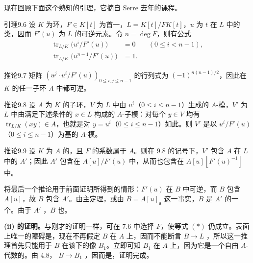 现在回顾下面这个熟知的引理，它摘自 Serre 去年的课程。
\begin{SGAresult}{引理}{9.6}
设 $K$ 为环，$F\in K[t]$ 为首一，$L=K[t]/FK[t]$，$u$ 为 $t$ 在 $L$ 中的类，因而 $F'(u)$ 为 $L$ 的可逆元素。令 $n=\deg F$，则有公式
\[
\begin{aligned}
 \operatorname{tr}_{L/K}\bigl(u^i/F'(u)\bigr)&=0 &&(0\leq i<n-1),\\
 \operatorname{tr}_{L/K}\bigl(u^{n-1}/F'(u)\bigr)&=1.
\end{aligned}
\]
\end{SGAresult}
\begin{SGAresult}{推论}{9.7}
矩阵 $(u^j\cdot u^i/F'(u))_{0\leq i,j\leq n-1}$ 的行列式为 $(-1)^{n(n-1)/2}$，因此在 $K$ 的任一子环 $A$ 中都可逆。
\end{SGAresult}
\begin{SGAresult}{推论}{9.8}
设 $A$ 为 $K$ 的子环，$V$ 为 $L$ 中由 $u^i$（$0\leq i\leq n-1$）生成的 $A$-模，$V'$ 为 $L$ 中由满足下述条件的 $x\in L$ 构成的 $A$-子模：对每个 $y\in V$ 均有 $\operatorname{tr}_{L/K}(xy)\in A$，也就是对 $y=u^i$（$0\leq i\leq n-1$）如此。则 $V'$ 是以 $u^i/F'(u)$（$0\leq i\leq n-1$）为基的 $A$-模。
\end{SGAresult}
\begin{SGAresult}{推论}{9.9}
设 $K$ 为 $A$ 的，且 $F$ 的系数属于 $A$。则在 9.8 的记号下，$V'$ 包含 $A$ 在 $L$ 中的 $A'$；因此 $A'$ 包含在 $A[u]/F'(u)$ 中，从而也包含在 $A[u][F'(u)^{-1}]$ 中。
\end{SGAresult}
将最后一个推论用于前面证明所得到的情形：$F'(u)$ 在 $B$ 中可逆，而 $B$ 包含 $A[u]$，故 $B$ 包含 $A'$。由主定理，或由 $B=A[u]_{\mathfrak n}$ 这一事实，$B$ 是 $A'$ 的一个。由于 $A'$ ，$B$ 也。

\textbf{(ii) 的证明。}与刚才的证明一样，可在 7.6 中选择 $F$，使等式 $(*)$ 仍成立。表面上唯一的障碍是，现在不再假定 $B$ 在 $A$ 上，因而不能断言 $B\to L$ ，所以这一推理首先只能用于 $B$ 在该下的像 $B_1$。立即可知 $B_1$ 在 $A$ 上，因为它是一个自由 $A$-代数的。由 4.8， $B\to B_1$ ，因而是，证明完成。

